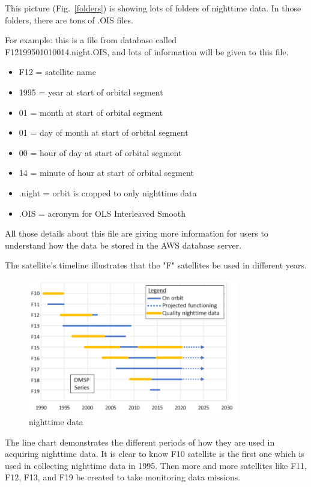 \documentclass[conference]{IEEEtran}
\begin{document}
This picture (Fig.~\ref{folders}) is showing lots of folders of nighttime data.  In those folders, there are tons of .OIS files. 

For example: this is a file from database called \\F12199501010014.night.OIS, and lots of information will be given to this file.

\begin{itemize}
    \item F12 = satellite name
    \item 1995 = year at start of orbital segment 
    \item 01 = month at start of orbital segment 
    \item 01 = day of month at start of orbital segment 
    \item 00 = hour of day at start of orbital segment
    \item 14 = minute of hour at start of orbital segment 
    \item .night = orbit is cropped to only nighttime data 
    \item .OIS = acronym for OLS Interleaved Smooth
\end{itemize}


All those details about this file are giving more information for users to understand how the data be stored in the AWS database server. 

The satellite's timeline illustrates that the "F" satellites be used in different years.

\begin{figure}[htbp]
\centerline{\includegraphics[width=260pt]{images/2.1.png}}
\caption{nighttime data}
\label{nighttimedata}
\end{figure}

The line chart demonstrates the different periods of how they are used in acquiring nighttime data.  It is clear to know F10 satellite 
is the first one which is used in collecting nighttime data in 1995. Then more and more satellites like F11, F12, F13, and F19 be created 
to take monitoring data missions.
\end{document}

